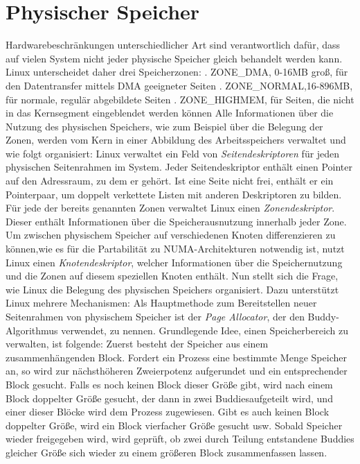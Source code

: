 \documentclass[11pt,a4paper]{article}
\begin{document}
\section*{Physischer Speicher}
Hardwarebeschränkungen unterschiedlicher Art sind verantwortlich dafür, dass auf vielen System nicht jeder physische Speicher gleich behandelt werden kann. Linux unterscheidet daher drei Speicherzonen:
. ZONE\_DMA, 0-16MB groß, für den Datentransfer mittels DMA geeigneter Seiten 
. ZONE\_NORMAL,16-896MB,  für normale, regulär abgebildete Seiten 
. ZONE\_HIGHMEM, für Seiten, die nicht in das Kernsegment eingeblendet werden können
\newline
\newline
Alle Informationen über die Nutzung des physischen Speichers, wie zum Beispiel über die Belegung der Zonen, werden vom Kern in einer Abbildung des Arbeitsspeichers verwaltet und wie folgt organisiert: 
\newline
Linux verwaltet ein Feld von \textit{Seitendeskriptoren} für jeden physischen Seitenrahmen im System. Jeder Seitendeskriptor enthält einen Pointer auf den Adressraum, zu dem er gehört. Ist eine Seite nicht frei, enthält er ein Pointerpaar, um doppelt verkettete Listen mit anderen Deskriptoren zu bilden. 
Für jede der bereits genannten Zonen verwaltet Linux einen \textit{Zonendeskriptor}. Dieser enthält Informationen über die Speicherausnutzung innerhalb jeder Zone.
Um zwischen physischem Speicher auf verschiedenen Knoten differenzieren zu können,wie es für die Partabilität zu NUMA-Architekturen notwendig ist, nutzt Linux einen \textit{Knotendeskriptor}, welcher Informationen über die Speichernutzung und die Zonen auf diesem speziellen Knoten enthält. 
\newline
\newline
Nun stellt sich die Frage, wie Linux die Belegung des physischen Speichers organisiert. Dazu unterstützt Linux mehrere Mechanismen:
\newline
Als Hauptmethode zum Bereitstellen neuer Seitenrahmen von physischem Speicher ist der \textit{Page Allocator}, der den Buddy-Algorithmus verwendet, zu nennen.
Grundlegende Idee, einen Speicherbereich zu verwalten, ist folgende: Zuerst besteht der Speicher aus einem zusammenhängenden Block. Fordert ein Prozess eine bestimmte Menge Speicher an, so wird zur nächsthöheren Zweierpotenz aufgerundet und ein entsprechender Block gesucht. Falls es noch keinen Block dieser Größe gibt, wird nach einem Block doppelter Größe gesucht, der dann in zwei \glqq Buddies\grqq  aufgeteilt wird, und einer dieser Blöcke wird dem Prozess zugewiesen. Gibt es auch keinen Block doppelter Größe, wird ein Block vierfacher Größe gesucht usw. Sobald Speicher wieder freigegeben wird, wird geprüft, ob zwei durch Teilung entstandene Buddies gleicher Größe sich wieder zu einem größeren Block zusammenfassen lassen. 
\end{document}

